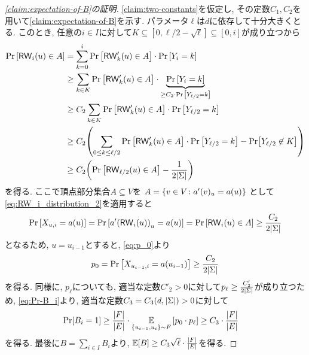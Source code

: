 \begin{proof}[\cref{claim:expectation-of-B}の証明]
  \cref{claim:two-constants}を仮定し, その定数$C_1,C_2$を用いて\cref{claim:expectation-of-B}を示す.
  パラメータ$\ell$は$d$に依存して十分大きくとる.
  このとき, 任意の$i\in I$に対して$K\subseteq [0,\ell/2-\sqrt{\ell}] \subseteq [0,i]$が成り立つから
  \begin{align}
    \Pr\qty[\mathsf{RW}_{i}(u)\in A] &= \sum_{k=0}^{i} \Pr\qty[\mathsf{RW}'_{k}(u) \in A] \cdot \Pr\qty[Y_{i}=k] \nonumber\\
    &\ge \sum_{k\in K} \Pr\qty[\mathsf{RW}'_{k}(u) \in A] \cdot \underbrace{\Pr\qty[Y_{i}=k]}_{\ge C_2\cdot \Pr\qty[Y_{\ell/2}=k]} \nonumber\\
    &\ge C_2 \sum_{k \in K} \Pr\qty[\mathsf{RW}'_{k}(u) \in A] \cdot \Pr\qty[Y_{\ell/2}=k] \nonumber\\
    &\ge C_2 \qty(\sum_{0\le k \le \ell/2} \Pr\qty[\mathsf{RW}'_{k}(u) \in A] \cdot \Pr\qty[Y_{\ell/2}=k] - \Pr[Y_{\ell/2}\not\in K]) \nonumber\\
    &\ge C_2 \qty( \Pr\qty[ \mathsf{RW}_{\ell/2}(u)\in A ] - \frac{1}{2\abs{\Sigma}} ) \label{eq:RW_i_distribution_2}
  \end{align}
  を得る. ここで頂点部分集合$A\subseteq V$を
  $A = \qty{ v \in V \colon a'(v)_u = a(u) }$
  として\cref{eq:RW_i_distribution_2}を適用すると
  \begin{align*}
    \Pr\qty[X_{u,i}=a(u)] = \Pr\qty[ a'\qty(\mathsf{RW}_{i}(u))_u = a(u) ] = \Pr\qty[\mathsf{RW}_{i}(u)\in A] \ge \frac{C_2}{2\abs{\Sigma}}
  \end{align*}
  となるため, $u=u_{i-1}$とすると, \cref{eq:p_0}より
  \begin{align*}
    p_0 = \Pr\qty[X_{u_{i-1},i} = a(u_{i-1})]\ge \frac{C_2}{2\abs{\Sigma}}
  \end{align*}
  を得る.
  同様に, $p_\ell$についても, 適当な定数$C'_2>0$に対して$p_{\ell}\ge \frac{C'_2}{2\abs{\Sigma}}$が成り立つため, \cref{eq:Pr-B_i}より, 適当な定数$C_3=C_3(d,\abs{\Sigma})>0$に対して
  \begin{align*}
    \Pr[B_i=1] &\ge \frac{\abs{F}}{\abs{E}} \cdot \operatorname*{\mathbb{E}}_{\{u_{i-1},u_i\}\sim F}\qty[ p_0 \cdot p_\ell ] \ge C_3\cdot \frac{\abs{F}}{\abs{E}}
  \end{align*}
  を得る. 最後に$B=\sum_{i\in I}B_i$より, $\operatorname*{\mathbb{E}}[B]\ge C_3\sqrt{\ell}\cdot \frac{\abs{F}}{\abs{E}}$を得る.
\end{proof}

